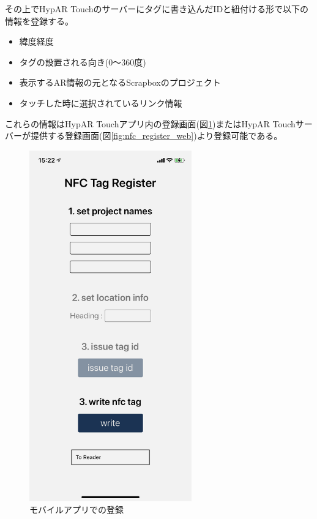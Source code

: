 その上でHypAR Touchのサーバーにタグに書き込んだIDと紐付ける形で以下の情報を登録する。
\begin{itemize}
  \item 緯度経度
  \item タグの設置される向き(0〜360度)
  \item 表示するAR情報の元となるScrapboxのプロジェクト
  \item タッチした時に選択されているリンク情報
\end{itemize}
これらの情報はHypAR Touchアプリ内の登録画面(図\ref{fig:nfc_register_mobile})またはHypAR Touchサーバーが提供する登録画面(図\ref{fig:nfc_register_web})より登録可能である。

\begin{figure}[h]
  \begin{minipage}{0.5\hsize}
    \centering
    \includegraphics[width=70mm]{images/nfc_register_mobile.png}
    \caption{モバイルアプリでの登録} \label{fig:nfc_register_mobile}
  \end{minipage}
  \begin{minipage}{0.5\hsize}
    \centering

\end{minipage}
\end{figure}
